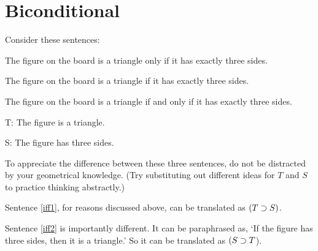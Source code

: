
%
%
%

\section{Biconditional}
Consider these sentences:
\begin{earg}
\item[\ex{iff1}] The figure on the board is a triangle only if it has exactly three sides.
\item[\ex{iff2}] The figure on the board is a triangle if it has exactly three sides.
\item[\ex{iff3}] The figure on the board is a triangle if and only if it has exactly three sides.
\end{earg}

\begin{ekey}
\item[T:] The figure is a triangle.
\item[S:] The figure has three sides.
\end{ekey}

To appreciate the difference between these three sentences, do not be distracted by your geometrical knowledge. (Try substituting out different ideas for $T$ and $S$ to practice thinking abstractly.)

Sentence \ref{iff1}, for reasons discussed above, can be translated as $(T\supset S)$.

Sentence \ref{iff2} is importantly different. It can be paraphrased as, `If the figure has three sides, then it is a triangle.' So it can be translated as $(S\supset T$).


